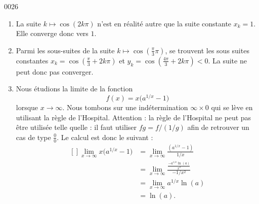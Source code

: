 
\begin{corrige}{0026}

\begin{enumerate}
\item La suite $k\mapsto \cos(2k\pi)$ n'est en réalité autre que la suite constante $x_k=1$. Elle converge donc vers $1$.
\item Parmi les sous-suites de la suite $k\mapsto\cos(\frac{ \pi }{ 3 }\pi)$, se trouvent les sous suites constantes $x_k=\cos(\frac{ \pi }{ 3 }+2k\pi)$ et $y_k=\cos(\frac{ 4\pi }{ 3 }+2k\pi)<0$. La suite ne peut donc pas converger.
\item Nous étudions la limite de la fonction
\begin{equation}
	f(x)=x\big( a^{1/x}-1 \big)
\end{equation}
lorsque $x\to\infty$. Nous tombons sur une indétermination $\infty\times 0$ qui se lève en utilisant la règle de l'Hospital. Attention : la règle de l'Hospital ne peut pas être utilisée telle quelle : il faut utiliser $fg=f/(1/g)$ afin de retrouver un cas de type $\frac{ 0 }{ 0 }$. Le calcul est donc le suivant :
\begin{equation}
	\begin{aligned}[]
		\lim_{x\to\infty} x\big( a^{1/x}-1 \big)	&=\lim_{x\to\infty}\frac{ (a^{1/x}-1) }{ 1/x }\\
				&=\lim_{x\to\infty}\frac{ \frac{ -a^{1/x}\ln(a) }{ x^2 } }{ -1/x^2 }\\
				&=\lim_{x\to\infty}a^{1/x}\ln(a)\\
				&=\ln(a).
	\end{aligned}
\end{equation}

\end{enumerate}


\end{corrige}
